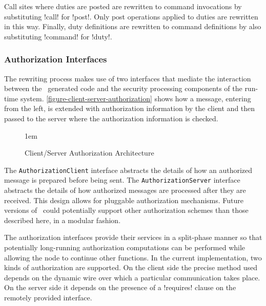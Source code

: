 
Call sites where duties are posted are rewritten to command invocations by substituting !call!
for !post!. Only post operations applied to duties are rewritten in this way. Finally, duty
definitions are rewritten to command definitions by also substituting !command! for !duty!.

\subsubsection{Authorization Interfaces}

The rewriting process makes use of two interfaces that mediate the interaction between the
\Sprocket\ generated code and the security processing components of the run-time system.
\autoref{figure-client-server-authorization} shows how a message, entering from the left, is
extended with authorization information by the client and then passed to the server where the
authorization information is checked.

\begin{figure}[htbp]
  
  \centerline{\raise 1em\box\graph}
  \caption{Client/Server Authorization Architecture}
  \label{figure-client-server-authorization}
\end{figure}

The \texttt{AuthorizationClient} interface abstracts the details of how an authorized message is
prepared before being sent. The \texttt{AuthorizationServer} interface abstracts the details of
how authorized messages are processed after they are received. This design allows for pluggable
authorization mechanisms. Future versions of \Sprocket\ could potentially support other
authorization schemes than those described here, in a modular fashion.

The authorization interfaces provide their services in a split-phase manner so that potentially
long-running authorization computations can be performed while allowing the node to continue
other functions. In the current implementation, two kinds of authorization are supported. On the
client side the precise method used depends on the dynamic wire over which a particular
communication takes place. On the server side it depends on the presence of a !requires! clause
on the remotely provided interface.

